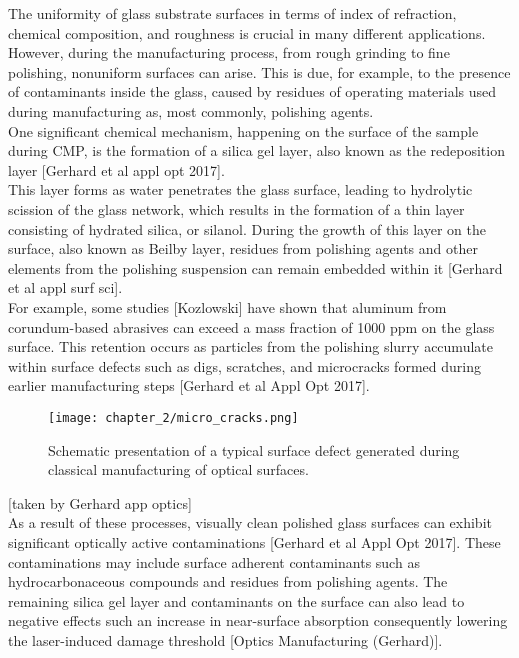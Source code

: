 The uniformity of glass substrate surfaces in terms of index of refraction, chemical composition, and roughness is crucial in many different applications. However, during the manufacturing process, from rough grinding to fine polishing, nonuniform surfaces can arise. This is due, for example, to the presence of contaminants inside the glass, caused by residues of operating materials used during manufacturing as, most commonly, polishing agents.
\\
One significant chemical mechanism, happening on the surface of the sample during CMP, is the formation of a silica gel layer, also known as the redeposition layer [Gerhard et al appl opt 2017].
\\
This layer forms as water penetrates the glass surface, leading to hydrolytic scission of the glass network, which results in the formation of a thin layer consisting of hydrated silica, or silanol. During the growth of this layer on the surface, also known as Beilby layer, residues from polishing agents and other elements from the polishing suspension can remain embedded within it [Gerhard et al appl surf sci].
\\
For example, some studies [Kozlowski] have shown that aluminum from corundum-based abrasives can exceed a mass fraction of 1000 ppm on the glass surface. This retention occurs as particles from the polishing slurry accumulate within surface defects such as digs, scratches, and microcracks formed during earlier manufacturing steps [Gerhard et al Appl Opt 2017].

\begin{figure}[H]
    \centering
    \texttt{[image: chapter\_2/micro\_cracks.png]}
    \caption[Schematic of a surface defect generated during optics manufacturing.]{ Schematic presentation of a typical surface defect generated
during classical manufacturing of optical surfaces. }
    \label{fig:micro_cracks}
\end{figure}
[taken by Gerhard app optics]
\\
As a result of these processes, visually clean polished glass surfaces can exhibit significant optically active contaminations [Gerhard et al Appl Opt 2017]. These contaminations may include surface adherent contaminants such as hydrocarbonaceous compounds and residues from polishing agents. The remaining silica gel layer and contaminants on the surface can also lead to negative effects such an increase in near-surface absorption consequently lowering the laser-induced damage threshold [Optics Manufacturing (Gerhard)].